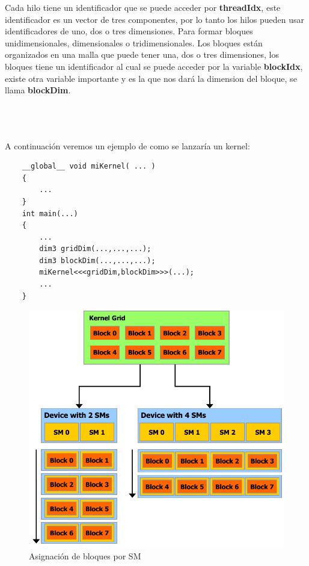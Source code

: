 Cada hilo tiene un identificador que se puede acceder por \textbf{threadIdx}, este identificador es un vector de tres componentes, por lo tanto los hilos pueden usar identificadores de uno, dos o tres dimensiones. Para formar bloques unidimensionales, dimensionales o tridimensionales. Los bloques están organizados en una malla que puede tener una, dos o tres dimensiones, los bloques tiene un identificador al cual se puede acceder por la variable \textbf{blockIdx}, existe otra variable importante y es la que nos dará la dimension del bloque, se llama \textbf{blockDim}.\\\\\\\\ 

\pagebreak

A continuación veremos un ejemplo de como se lanzaría un kernel:

\begin{lstlisting}
	__global__ void miKernel( ... )
    {
   		...
    }
	int main(...)
	{
		...	
		dim3 gridDim(...,...,...);
		dim3 blockDim(...,...,...);
		miKernel<<<gridDim,blockDim>>>(...);	
		...
	}
\end{lstlisting}

\begin{figure}[h]
			\centering
				\includegraphics[scale=0.4]{img/block_sm.png}
			\caption{Asignación de bloques por SM}
\end{figure}

